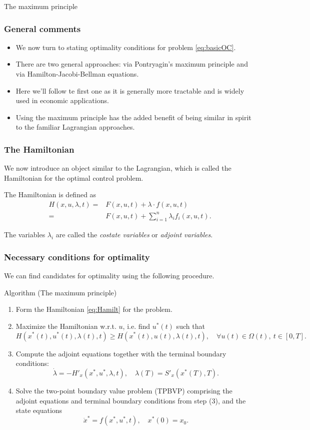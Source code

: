 \documentclass[10pt]{beamer}
\theoremstyle{definition}
\begin{document}
\begin{section}{The maximum principle}\label{sec:max}

\begin{frame}[fragile]
\frametitle{General comments}
\begin{itemize}\itemsep1em
\item We now turn to stating optimality conditions for problem \eqref{eq:basicOC}.
\item There are two general approaches: via Pontryagin's maximum principle and via Hamilton-Jacobi-Bellman equations.
\item Here we'll follow te first one as it is generally more tractable and is widely used in economic applications.
\item Using the maximum principle has the added benefit of being similar in spirit to the familiar Lagrangian approaches. 
\end{itemize}
\end{frame}

\begin{frame}[fragile]
\frametitle{The Hamiltonian}

We now introduce an object similar to the Lagrangian, which is called the Hamiltonian for the optimal control problem.\bigskip

The Hamiltonian is defined as
\begin{equation}
\begin{split}
H(x,u,\lambda,t) =& F(x,u,t)+\lambda \cdot f(x,u,t) \\
=&  F(x,u,t)+\sum_{i=1}^{n}\lambda_i f_i(x,u,t).
\end{split}
\label{eq:Hamilt}
\end{equation}\bigskip

The variables $ \lambda_i $ are called the \emph{costate variables} or \emph{adjoint variables}.
\end{frame}

\begin{frame}[fragile]
\frametitle{Necessary conditions for optimality}
We can find candidates for optimality using the following procedure.

\begin{block}{Algorithm (The maximum principle)}
\begin{enumerate}
\item Form the Hamiltonian \eqref{eq:Hamilt} for the problem.
\item Maximize the Hamiltonian w.r.t. $ u $, i.e. find $ u^*(t) $ such that
\[ H(x^*(t),u^*(t),\lambda(t),t)\geq  H(x^*(t),u(t),\lambda(t),t),\quad \forall u(t)\in \Omega(t),~t \in[0,T]. \]
\item Compute the adjoint equations together with the terminal boundary conditions:
\[ \dot{\lambda} = -H'_x(x^*,u^*,\lambda,t),\quad \lambda(T)=S'_x(x^*(T),T).  \]
\item Solve the two-point boundary value problem (TPBVP) comprising the adjoint equations and terminal boundary conditions from step (3), and the state equations \[ \dot{x}^* = f(x^*,u^*,t), \quad x^*(0)=x_0. \]
\end{enumerate}
\end{block}
\end{frame}


\end{section}
\end{document}
